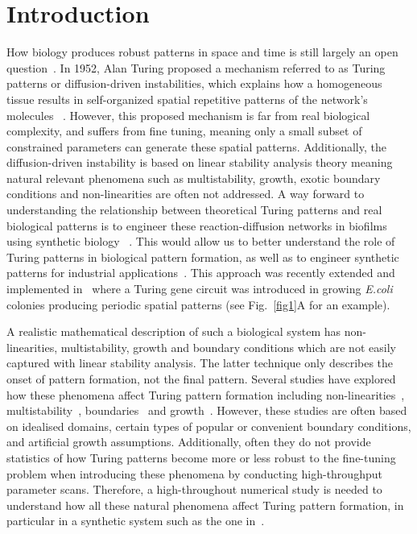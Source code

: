 \section{Introduction}

How biology produces robust patterns in space and time is still largely an open question~\parencite{scholes2017three}.
In 1952, Alan Turing proposed a mechanism referred to as Turing patterns or diffusion-driven instabilities, which explains how a homogeneous tissue results in self-organized spatial repetitive patterns of the network’s molecules ~\parencite{Turing1952, Gierer1972}.
However, this proposed mechanism is far from real biological complexity, and suffers from fine tuning, meaning only a small subset of constrained parameters can generate these spatial patterns.
Additionally, the diffusion-driven instability is based on linear stability analysis theory meaning natural relevant phenomena such as multistability, growth, exotic boundary conditions and non-linearities are often not addressed.
A way forward to understanding the relationship between theoretical Turing patterns and real biological patterns is to engineer these reaction-diffusion networks in biofilms using synthetic biology ~\parencite{Sekine2018, Karig2018}.
This would allow us to better understand the role of Turing patterns in biological pattern formation, as well as to engineer synthetic patterns for industrial applications~\parencite{cao2017programmable, tan2018polyamide,din2020interfacing}.
This approach was recently extended and implemented in~\cite{Oliver2023} where a Turing gene circuit was introduced in growing \textit{E.coli} colonies producing periodic spatial patterns (see Fig.~\ref{fig1}A for an example).

A realistic mathematical description of such a biological system has non-linearities, multistability, growth and boundary conditions which are not easily captured with linear stability analysis. The latter technique only describes the onset of pattern formation, not the final pattern.
Several studies have explored how these phenomena affect Turing pattern formation including non-linearities~\parencite{ermentrout1991stripes}, multistability~\parencite{Krause2023}, boundaries~\parencite{Arcuri1986,Maini1993, Maini1997,Krause2020, Krause2021, Woolley2022} and growth~\parencite{gaffney2010, Klika2017, Krause2019}.
However, these studies are often based on idealised domains, certain types of popular or convenient boundary conditions, and artificial growth assumptions.
Additionally, often they do not provide statistics of how Turing patterns become more or less robust to the fine-tuning problem when introducing these phenomena by conducting high-throughput parameter scans.
Therefore, a high-throughout numerical study is needed to understand how all these natural phenomena affect Turing pattern formation, in particular in a synthetic system such as the one in~\cite{Oliver2023}.

